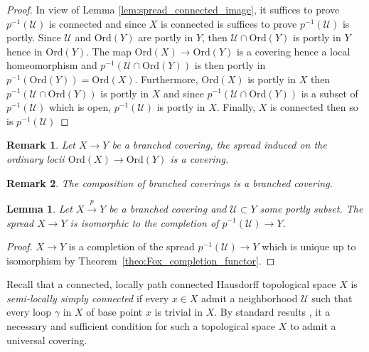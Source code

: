\documentclass[a4paper,12pt]{article}
\newtheorem{lem}{Lemma}[section]          %
\newtheorem{rem}{Remark}             %
\def\U{\mathcal U}
\def\U{\mathcal{U}}
\def\ord{\mathrm{Ord}}
\begin{document}
\begin{proof} In view of Lemma \ref{lem:spread_connected_image}, it suffices to prove $p^{-1}(\U)$ is connected and since $X$ is connected is suffices to prove $p^{-1}(\U)$ is portly. Since $\U$ and $\ord(Y)$ are portly in $Y$, then $\U\cap \ord(Y)$ is portly in $Y$ hence in $\ord(Y)$. The map $\ord(X)\rightarrow \ord(Y)$ is a covering hence a local homeomorphism and $p^{-1}(\U\cap \ord(Y))$ is then portly in $p^{-1}(\ord(Y))=\ord(X)$. Furthermore, $\ord(X)$ is portly in $X$ then $ p^{-1}(\U\cap \ord(Y))$ is portly in $X$ and since $p^{-1}(\U\cap \ord(Y))$ is a subset of $p^{-1}(\U)$ which is open, $p^{-1}(\U)$ is portly in $X$.
 Finally, $X$ is connected then so is $p^{-1}(\U)$
\end{proof}




\begin{rem}\label{rem:branched_covering_spread_induced} Let $X\rightarrow Y$ be a branched covering, the spread induced on the ordinary locii $\ord(X)\rightarrow \ord(Y)$ is a covering.
\end{rem}
\begin{rem}\label{rem:composition_branched_coverings_branched} The composition of branched coverings is a branched covering.
\end{rem}



\begin{lem}\label{rem:completion_covering} Let $X\xrightarrow{p} Y$ be a branched covering and $\U\subset Y$ some portly subset. The spread $X\rightarrow Y$ is isomorphic to the completion of $p^{-1}(\U)\rightarrow Y$.
\end{lem}
\begin{proof}
 $X\rightarrow Y$ is a completion of the spread $p^{-1}(\U)\rightarrow Y$ which is unique up to isomorphism by Theorem~\ref{theo:Fox_completion_functor}.
\end{proof}




Recall that a connected, locally path connected Hausdorff topological space $X$ is {\it semi-locally simply connected} if every $x\in X$ admit a neighborhood $\U$ such that every loop $\gamma$ in $X$ of base point $x$ is trivial in $X$. By standard results \cite{MR1700700}, it a necessary and sufficient condition for such a topological space $X$ to admit a universal covering.
\end{document}

